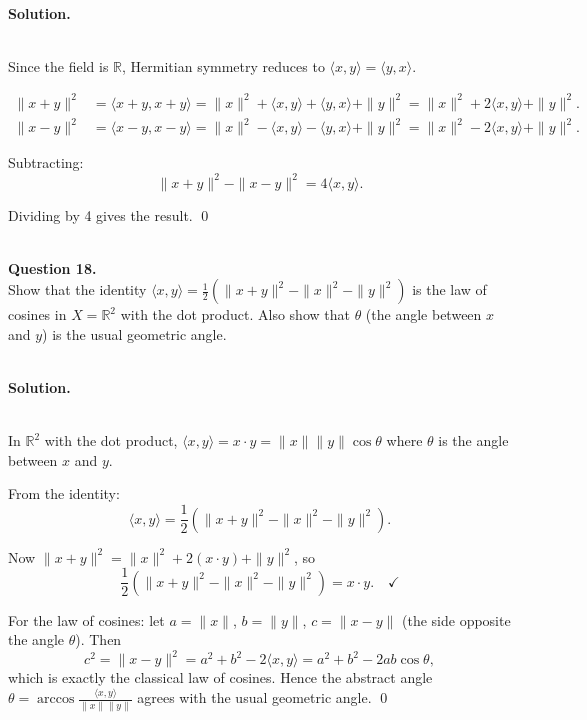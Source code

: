 \documentclass{article}
\newcommand{\RR}{\mathbb{R}}
\newcommand{\ip}[2]{\langle #1, #2 \rangle}
\begin{document}
\noindent\\
\textbf{Solution.}\\
\quad\\
\begin{mdframed}[linewidth=1pt]
Since the field is $\RR$, Hermitian symmetry reduces to $\ip{x}{y} = \ip{y}{x}$.

\begin{align*}
\|x + y\|^2 &= \ip{x+y}{x+y} = \|x\|^2 + \ip{x}{y} + \ip{y}{x} + \|y\|^2 = \|x\|^2 + 2\ip{x}{y} + \|y\|^2. \\
\|x - y\|^2 &= \ip{x-y}{x-y} = \|x\|^2 - \ip{x}{y} - \ip{y}{x} + \|y\|^2 = \|x\|^2 - 2\ip{x}{y} + \|y\|^2.
\end{align*}

Subtracting:
\[
\|x+y\|^2 - \|x-y\|^2 = 4\ip{x}{y}.
\]

Dividing by 4 gives the result. \qed
\end{mdframed}

\bigskip


\hfill \break  $~\!\!$ \dotfill \medskip \\
\textbf{Question 18.}\\
Show that the identity $\ip{x}{y} = \frac{1}{2}(\|x+y\|^2 - \|x\|^2 - \|y\|^2)$ is the law of cosines in $X = \RR^2$ with the dot product. Also show that $\theta$ (the angle between $x$ and $y$) is the usual geometric angle.

\noindent\\
\textbf{Solution.}\\
\quad\\
\begin{mdframed}[linewidth=1pt]
In $\RR^2$ with the dot product, $\ip{x}{y} = x \cdot y = \|x\|\|y\|\cos\theta$ where $\theta$ is the angle between $x$ and $y$.

From the identity:
\[
\ip{x}{y} = \frac{1}{2}\left(\|x+y\|^2 - \|x\|^2 - \|y\|^2\right).
\]

Now $\|x + y\|^2 = \|x\|^2 + 2(x \cdot y) + \|y\|^2$, so
\[
\frac{1}{2}(\|x+y\|^2 - \|x\|^2 - \|y\|^2) = x \cdot y. \quad \checkmark
\]

For the law of cosines: let $a = \|x\|$, $b = \|y\|$, $c = \|x - y\|$ (the side opposite the angle $\theta$). Then
\[
c^2 = \|x - y\|^2 = a^2 + b^2 - 2\ip{x}{y} = a^2 + b^2 - 2ab\cos\theta,
\]
which is exactly the classical law of cosines. Hence the abstract angle $\theta = \arccos\frac{\ip{x}{y}}{\|x\|\|y\|}$ agrees with the usual geometric angle. \qed
\end{mdframed}
\end{document}
